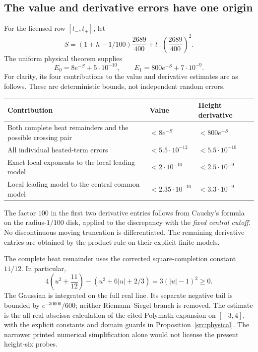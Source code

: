 \documentclass[11pt,a4paper]{article}
\theoremstyle{definition}
\theoremstyle{remark}
\begin{document}
\subsection{The value and derivative errors have one origin}

For the licensed row $[t_-,t_+]$, let
\[
 S=(1+h-1/100)\frac{2689}{400}
       +t_-\left(\frac{2689}{400}\right)^2.
\]
The uniform physical theorem supplies
\[
 E_0=8e^{-S}+5\cdot10^{-10},\qquad
 E_1=800e^{-S}+7\cdot10^{-9}.
\]
For clarity, its four contributions to the value and derivative
estimates are as follows. These are deterministic bounds, not independent
random errors.
\begin{center}\small
\begin{tabular}{p{}p{}p{}}
\toprule
Contribution & Value & Height derivative\\\midrule
Both complete heat remainders and the possible crossing pair
 & $<8e^{-S}$ & $<800e^{-S}$\\
All individual heated-term errors
 & $<5.5\cdot10^{-12}$ & $<5.5\cdot10^{-10}$\\
Exact local exponents to the local leading model
 & $<2\cdot10^{-10}$ & $<2.5\cdot10^{-9}$\\
Local leading model to the central common model
 & $<2.35\cdot10^{-10}$ & $<3.3\cdot10^{-9}$\\\bottomrule
\end{tabular}
\end{center}
The factor $100$ in the first two derivative entries follows from
Cauchy's formula on the radius-$1/100$ disk, applied to the discrepancy
with the \emph{fixed central cutoff}. No discontinuous moving truncation
is differentiated. The remaining derivative entries are obtained by the
product rule on their explicit finite models.

The complete heat remainder uses the corrected square-completion
constant $11/12$. In particular,
\[
 4\left(u^2+\frac{11}{12}\right)
 -(u^2+6|u|+2/3)=3(|u|-1)^2\ge0.
\]
The Gaussian is integrated on the full real line. Its separate negative
tail is bounded by $e^{-30000}/600$; neither Riemann--Siegel branch is
removed. The estimate is the all-real-abscissa calculation of the cited
Polymath expansion on $[-3,4]$, with the explicit constants and domain
guards in Proposition~\ref{src:physical}. The narrower printed numerical
simplification alone would not license the present height-six probes.
\end{document}
